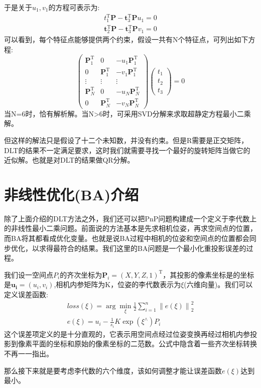 于是关于$u_1,v_1$的方程可表示为:
\begin{equation}
\begin{array}{l}{t_{1}^{\mathrm{T}} \boldsymbol{P}-\boldsymbol{t}_{3}^{\mathrm{T}} \boldsymbol{P} u_{1}=0} \\ {\boldsymbol{t}_{2}^{\mathrm{T}} \boldsymbol{P}-\boldsymbol{t}_{3}^{\mathrm{T}} \boldsymbol{P} v_{1}=0}\end{array}
\end{equation}
可以看到，每个特征点能够提供两个约束，假设一共有N个特征点，可列出如下方程:
\begin{equation}
\left(\begin{array}{ccc}
{\boldsymbol{P}_{1}^{\mathrm{T}}} & {0} & {-u_{1} \boldsymbol{P}_{1}^{\mathrm{T}}} \\ {0} & {\boldsymbol{P}_{1}^{\mathrm{T}}} & {-v_{1} \boldsymbol{P}_{1}^{\mathrm{T}}} \\ {\vdots} & {\vdots} & {\vdots} \\ {\boldsymbol{P}_{N}^{\mathrm{T}}} & {0} & {-u_{N} \boldsymbol{P}_{N}^{\mathrm{T}}} \\ {0} & {\boldsymbol{P}_{N}^{\mathrm{T}}} & {-v_{N} \boldsymbol{P}_{N}^{\mathrm{T}}}
\end{array}\right)\left( \begin{array}{l}{t_{1}} \\ {t_{2}} \\ {t_{3}}\end{array}\right)=0
\end{equation}
当N=6时，恰有解析解。当N>6时，可采用SVD分解来求取超静定方程最小二乘解。\par
但这样的解法只是假设了十二个未知数，并没有约束。但是R需要是正交矩阵，DLT的结果不一定满足要求，这时我们就需要寻找一个最好的旋转矩阵当做它的近似解。也就是对DLT的结果做QR分解。
\section{非线性优化(BA)介绍}
除了上面介绍的DLT方法之外，我们还可以把PnP问题构建成一个定义于李代数上的非线性最小二乘问题。前面说的方法基本是先求相机位姿，再求空间点的位置，而BA将其都看成优化变量。也就是说BA过程中相机的位姿和空间点的位置都会同步优化，以求得最符合的结果。我们这里的BA问题是一个最小化重投影误差的过程。\par
我们设一空间点$P_i$的齐次坐标为$\boldsymbol{P}_i=(X, Y, Z, 1)^{\mathrm{T}}$，其投影的像素坐标是的坐标是$\boldsymbol{u_i}=(u_i, v_i)$,相机内参矩阵为K，位姿的李代数表示为$\xi$(六维向量)。我们可以定义误差函数:
\begin{equation}
\begin{aligned}
loss(\xi)=\arg \min _{\xi} \frac{1}{2} \sum_{i=1}^{n}\left\|e(\xi)\right\|_{2}^{2}\\
e(\xi)=u_{i}-\frac{1}{s_{i}} K \exp \left(\xi^{\wedge}\right) P_{i}
\end{aligned}
\label{equ:ba}
\end{equation}
这个误差项定义的是十分直观的，它表示用空间点经过位姿变换再经过相机内参投影到像素平面的坐标和原始的像素坐标的二范数。公式中隐含着一些齐次坐标转换不再一一指出。\par
那么接下来就是要考虑李代数的六个维度，该如何调整才能让误差函数$e(\xi)$达到最小。
